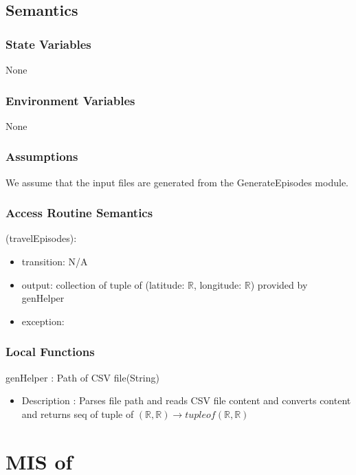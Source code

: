 \documentclass[12pt, titlepage]{article}
\begin{document}
\subsection{Semantics}
\subsubsection{State Variables}
None
\subsubsection{Environment Variables}
None
\subsubsection{Assumptions}
We assume that the input files are generated from the GenerateEpisodes module.

\subsubsection{Access Routine Semantics}


\noindent {}(travelEpisodes):
\begin{itemize}
\item transition: N/A
\item output: collection of tuple of (latitude: $\mathbb{R}$, longitude: $\mathbb{R}$) provided by genHelper
\item exception:  
\end{itemize}


\subsubsection{Local Functions}


genHelper : Path of CSV file(String)
\begin{itemize}
    \item Description : Parses file path and reads CSV file content and converts content and returns seq of tuple of $(\mathbb{R}, \mathbb{R})  \rightarrow tuple of (\mathbb{R}, \mathbb{R})$
\end{itemize}


  
\newpage

\section{MIS of } \label{ModuleSPath} 
\end{document}
